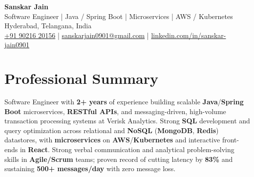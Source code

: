 \documentclass[a4paper,10pt]{article}
\begin{document}
\begin{center}
    {\LARGE \textbf{Sanskar Jain}} \\
    \vspace{2pt}
    Software Engineer \;|\; Java / Spring Boot \;|\; Microservices \;|\; AWS / Kubernetes \\
    \vspace{2pt}
    Hyderabad, Telangana, India \\
    \href{tel:+919021620156}{+91 90216 20156} \;|\;
    \href{mailto:sanskarjain0901@gmail.com}{sanskarjain0901@gmail.com} \;|\;
    \href{https://www.linkedin.com/in/sanskar-jain0901/}{linkedin.com/in/sanskar-jain0901}
\end{center}

\vspace{3pt}

\section*{Professional Summary}
Software Engineer with \textbf{2+ years} of experience building scalable \textbf{Java}/\textbf{Spring Boot} microservices, \textbf{RESTful APIs}, and messaging-driven, high-volume transaction processing systems at Verisk Analytics.
Strong \textbf{SQL} development and query optimization across relational and \textbf{NoSQL} (\textbf{MongoDB}, \textbf{Redis}) datastores, with \textbf{microservices} on \textbf{AWS}/\textbf{Kubernetes} and interactive front-ends in \textbf{React}.
Strong verbal communication and analytical problem-solving skills in \textbf{Agile/Scrum} teams; proven record of cutting latency by \textbf{83\%} and sustaining \textbf{500+ messages/day} with zero message loss.
\end{document}
